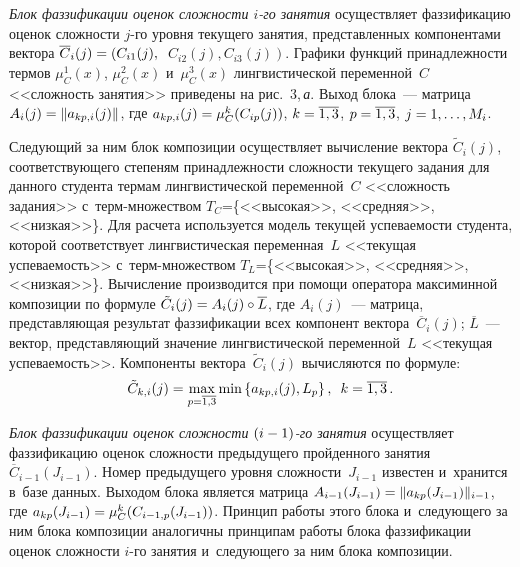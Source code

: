 \begin{multicols}{2}
  \textit{Блок фаззификации оценок сложности $i$-го занятия} осуществляет 
фаззификацию оценок сложности $j$-го уровня текущего занятия, 
пред\-став\-лен\-ных компонентами вектора $\overline{C}_i(j)\hm= \left( C_{i1}(j),\right.$\linebreak
$\left. 
C_{i2}(j), C_{i3}(j)\right)$. Графики функций принадлежности термов 
$\mu^1_C(x)$, $\mu^2_C(x)$ и~$\mu^3_C(x)$ лингвистической переменной~$C$ 
<<сложность занятия>> приведены на рис.~3,\,\textit{а}. Выход  
блока~--- матрица $A_i(j)\hm= \| a_{kp,i}(j)\|$, где $a_{kp,i}(j)\hm= 
\mu^k_C(C_{ip}(j))$, $k\hm= \overline{1,3}$, $p\hm= \overline{1,3}$, $j\hm= 
1,\ldots, M_i$.
  
  Следующий за ним блок композиции осуществ\-ляет вычисление вектора 
 $\tilde{C}_i(j)$, соответст\-ву\-юще\-го\linebreak
  степеням принадлежности сложности текущего 
зада\-ния для данного студента термам лингвистической переменной~$C$ 
<<сложность задания>> с~терм-мно\-же\-ст\-вом $T_C$\;=\;\{<<высокая>>, 
<<средняя>>, <<низкая>>\}. Для расчета используется модель текущей\linebreak 
успе\-ва\-емости студента, которой соответствует лингвистическая 
переменная~$L$ <<текущая ус\-пе\-ва\-емость>> с~терм-мно\-же\-ст\-вом 
$T_L$\;=\;\{<<высокая>>, <<средняя>>, <<низкая>>\}. Вычисление 
производится при помощи оператора максиминной композиции по формуле 
$\tilde{C}_i(j)\hm= A_i(j)\circ \overline{L}$, где $A_i(j)$~--- матрица, 
представляющая результат фаззификации всех компонент 
вектора~$\overline{C}_i(j)$; $\overline{L}$~--- вектор, представляющий 
значение лингвистической переменной~$L$ <<текущая успеваемость>>. 
Компоненты вектора~$\tilde{C}_i(j)$ вы\-чис\-ля\-ют\-ся по формуле:
$$
\tilde{C}_{k,i}(j)= \max\limits_{p=\overline{1,3}}\min \left\{ a_{kp,i}(j), 
L_p\right\},\enskip  k=\overline{1,3}\,.
$$

 
  \textit{Блок фаззификации оценок сложности $(i\hm-1)$-го занятия} 
осуществляет фаззификацию оценок сложности предыдущего пройденного 
занятия $\overline{C}_{i-1}(J_{i-1})$. Номер предыдущего уровня 
сложности~$J_{i-1}$ известен и~хранится в~базе данных. Выходом блока 
является матрица $A_{i-1}(J_{i-1})\hm= \| a_{kp}(J_{i-1})\|_{i-1}$, где 
$a_{kp}(J_{i-1})\hm= \mu_C^k(C_{i-1,p}(J_{i-1}))$. Принцип работы этого 
блока и~следующего за ним блока композиции аналогичны принципам работы 
блока фаззификации оценок сложности $i$-го занятия и~следующего за ним 
блока композиции.
  

\end{multicols}
